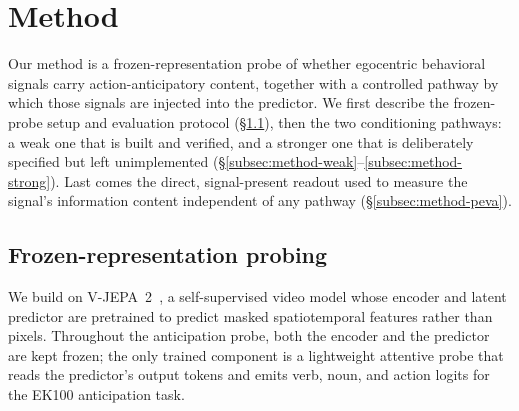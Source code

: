 \section{Method}

Our method is a frozen-representation probe of whether egocentric behavioral
signals carry action-anticipatory content, together with a controlled pathway
by which those signals are injected into the predictor. We first describe the
frozen-probe setup and evaluation protocol (\S\ref{subsec:method-setup}), then
the two conditioning pathways: a weak one that is built and verified, and a
stronger one that is deliberately specified but left unimplemented
(\S\ref{subsec:method-weak}--\ref{subsec:method-strong}). Last comes the
direct, signal-present readout used to measure the signal's information content
independent of any pathway (\S\ref{subsec:method-peva}).

\subsection{Frozen-representation probing}
\label{subsec:method-setup}

We build on V-JEPA~2~\citep{assran2025vjepa2}, a self-supervised video model
whose encoder and latent predictor are pretrained to predict masked
spatiotemporal features rather than pixels. Throughout the anticipation probe, both the encoder and the
predictor are kept frozen; the only trained component is a lightweight attentive
probe that reads the predictor's output tokens and emits verb, noun, and action
logits for the EK100 anticipation task.

